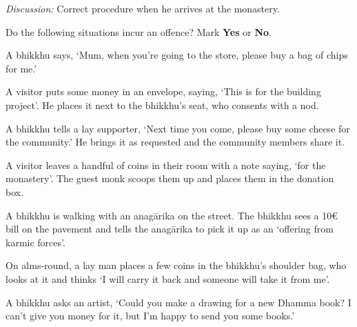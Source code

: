 \begin{exam}{\autoExamName}
    \emph{Discussion:} Correct procedure when he arrives at the monastery.

  \problemDivide

  \begin{problem*}

    Do the following situations incur an offence? Mark \textbf{Yes} or \textbf{No}.

    \bigskip

    \begin{parts}

    \item {} A bhikkhu says, `Mum, when you're going to the store, please
    buy a bag of chips for me.'

    \bigskip

    \item {} A visitor puts some money in an envelope, saying, `This is for
      the building project'. He places it next to the bhikkhu's seat, who
      consents with a nod.

    \bigskip

    \item {} A bhikkhu tells a lay supporter, `Next time you come, please
      buy some cheese for the community.' He brings it as requested and the
      community members share it.

    \bigskip

    \item {} A visitor leaves a handful of coins in their room with a note saying, `for the monastery'.
      The guest monk scoops them up and places them in the donation box.

    \bigskip

    \item {} A bhikkhu is walking with an anagārika on the street. The
      bhikkhu sees a 10€ bill on the pavement and tells the anagārika to pick it
      up as an `offering from karmic forces'.

    \bigskip

    \item {} On alms-round, a lay man places a few coins in the bhikkhu's
      shoulder bag, who looks at it and thinks `I will carry it back and someone
      will take it from me'.

    \bigskip

    \item {} A bhikkhu asks an artist, `Could you make a drawing for a new
      Dhamma book? I can't give you money for it, but I'm happy to send you some
      books.'

    \end{parts}
    
  \end{problem*}

\end{exam}


